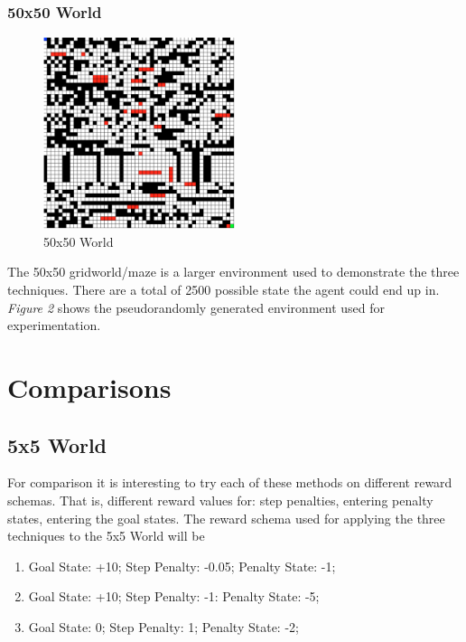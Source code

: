 \documentclass[a4paper,10pt]{article}
\begin{document}
\subsubsection{50x50 World}
\begin{figure}[htb!]
\centering
\includegraphics[width=0.5\textwidth]{figures/50by50_nopolicy.png}
\caption{50x50 World}
\end{figure}

The 50x50 gridworld/maze is a larger environment used to demonstrate the three techniques. There are a total of 2500 possible state the agent could end up in. \textit{Figure 2} shows the pseudorandomly generated environment used for experimentation.

\section{Comparisons}
\subsection{5x5 World}
For comparison it is interesting to try each of these methods on different reward schemas. That is, different reward values for: step penalties, entering penalty states, entering the goal states. The reward schema used for applying the three techniques to the 5x5 World will be

\begin{enumerate}
\item Goal State: +10; Step Penalty: -0.05; Penalty State: -1;
\item Goal State: +10; Step Penalty: -1: Penalty State: -5;
\item Goal State: 0; Step Penalty: 1; Penalty State: -2;
\end{enumerate}
\end{document}
